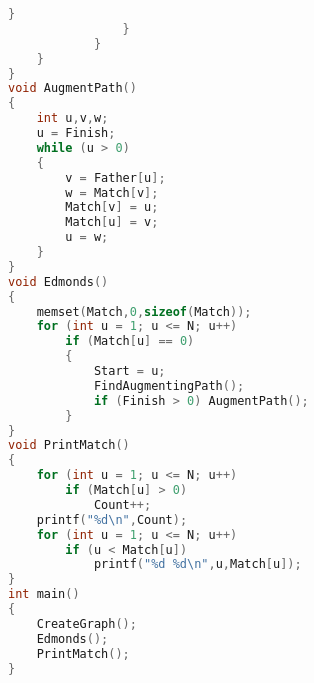 \begin{lstlisting}[language=c++]
                    }
                }
            }
    }
}
void AugmentPath()
{
    int u,v,w;
    u = Finish;
    while (u > 0)
    {
        v = Father[u];
        w = Match[v];
        Match[v] = u;
        Match[u] = v;
        u = w;
    }
}
void Edmonds()
{
    memset(Match,0,sizeof(Match));
    for (int u = 1; u <= N; u++)
        if (Match[u] == 0)
        {
            Start = u;
            FindAugmentingPath();
            if (Finish > 0) AugmentPath();
        }
}
void PrintMatch()
{
    for (int u = 1; u <= N; u++)
        if (Match[u] > 0)
            Count++;
    printf("%d\n",Count);
    for (int u = 1; u <= N; u++)
        if (u < Match[u])
            printf("%d %d\n",u,Match[u]);
}
int main()
{
    CreateGraph();
    Edmonds();
    PrintMatch();
}
    \end{lstlisting}